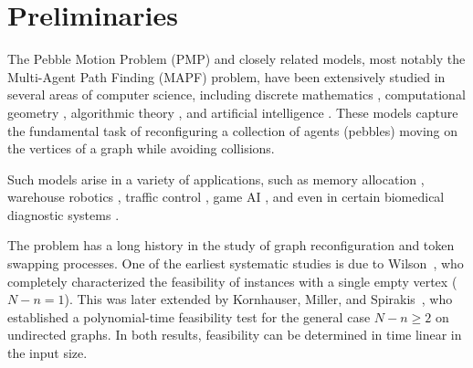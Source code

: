 \documentclass[letter,11pt]{article}
\theoremstyle{definition}
\theoremstyle{definition}
\newcommand{\1}{\boldmath$~1~$\unboldmath}
\newcounter{aaa}
\begin{document}

\section{Preliminaries}\label{pre}

The Pebble Motion Problem (PMP) and closely related models,
most notably the Multi-Agent Path Finding (MAPF) problem,
have been extensively studied in several areas of computer science,
including
discrete mathematics \cite{
loyd1959mathematical,
zbMATH03446929,
aa887662-c3e2-30b0-a475-bcd8c655206a, 
WOS:000083999100001,
WOS:000254460900008, 
zbMATH05966071,
WOS:000301306200015, 
zbMATH06431549, 
WOS:000378029000042, 
zbMATH07360934, 
WOS:001155044500001}, 
computational geometry \cite{9981807, a16110498}, 
algorithmic theory \cite{715921, 
365740, 
zbMATH04155895, 
WOS:000077614700003, 
WOS:000168095200003, 
WOS:000254460900008, 
WOS:000280552200005, 
WOS:000378029000042, 
WOS:001177663400002,  
WOS:001155044500001, 
ARDIZZONI2025104372}, 
and artificial intelligence \cite{10.5555/3463952.3464166,
10.5555/3463952.3464075, 
Huang_Li_Koenig_Dilkina_2022, 
10.1609/aaai.v39i22.34501, 
yang2025mapfworldactionworldmodel}. 
These models capture the fundamental task of reconfiguring
a collection of agents (pebbles) moving on the vertices of a graph
while avoiding collisions.

Such models arise in a variety of applications, 
such as memory allocation \cite{715921}, 
warehouse robotics \cite{WOS:000521238104083, 
WOS:000559287300006, 
LiAAAI21lifelong, 
WOS:000767667600009, 
WOS:000838038300001, 
ijcai2023p611, 
DBLP:conf/ecai/Lehoux-Lebacque24}, 
traffic control \cite{WOS:000455723500030, 
WOS:000860325800004, 
WOS:001136907801043, 
WOS:000958827700001, 
WOS:001199810300001}, 
game AI \cite{WOS:000345499600001, 
WOS:000356269500008, 
WOS:000441027500010}, 
and even in certain biomedical diagnostic systems \cite{WOS:001303734200001}.


The problem has a long history in the study of graph reconfiguration
and token swapping processes.
One of the earliest systematic studies is due to Wilson~\cite{zbMATH03446929},
who completely characterized the feasibility of instances
with a single empty vertex ($N-n=1$).
This was later extended by Kornhauser, Miller, and Spirakis~\cite{715921},
who established a polynomial-time feasibility test
for the general case $N-n \ge 2$ on undirected graphs.
In both results, feasibility can be determined in time linear in the input size.
\end{document}

